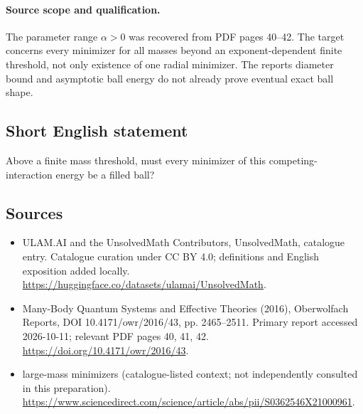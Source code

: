 \documentclass[11pt]{article}
\begin{document}
\paragraph{Source scope and qualification.}
The parameter range $\alpha>0$ was recovered from PDF pages 40--42. The target concerns every minimizer for all masses beyond an exponent-dependent finite threshold, not only existence of one radial minimizer. The report\textquotesingle s diameter bound and asymptotic ball energy do not already prove eventual exact ball shape.
\subsection{Short English statement}
Above a finite mass threshold, must every minimizer of this competing-interaction energy be a filled ball?
\subsection{Sources}
\begin{itemize}
\item[\hypertarget{source:statement:1}{S1}] ULAM.AI and the UnsolvedMath Contributors, UnsolvedMath, catalogue entry. Catalogue curation under CC BY 4.0; definitions and English exposition added locally.
\url{https://huggingface.co/datasets/ulamai/UnsolvedMath}.
\item[\hypertarget{source:statement:2}{S2}] Many-Body Quantum Systems and Effective Theories (2016), Oberwolfach Reports, DOI 10.4171/owr/2016/43, pp. 2465--2511. Primary report accessed 2026-10-11; relevant PDF pages 40, 41, 42.
\url{https://doi.org/10.4171/owr/2016/43}.
\item[\hypertarget{source:statement:3}{S3}] large-mass minimizers (catalogue-listed context; not independently consulted in this preparation).
\url{https://www.sciencedirect.com/science/article/abs/pii/S0362546X21000961}.
\end{itemize}
\label{end:statement}
\end{document}
